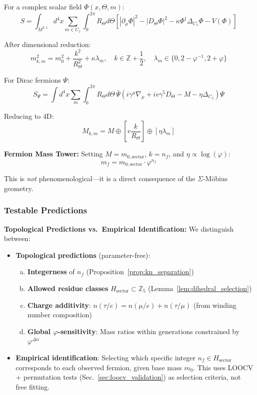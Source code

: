 \documentclass[12pt]{article}
\begin{document}
For a complex scalar field $\Phi(x, \Theta, m)$:
\begin{equation}
S = \int_{M^{3,1}} d^4x \sum_{m \in C_5} \int_0^{2\pi} R_\Theta d\Theta \left[ |\partial_\mu \Phi|^2 - |D_\Theta \Phi|^2 - \kappa \Phi^\dagger \Delta_{C_5} \Phi - V(\Phi) \right]
\end{equation}

After dimensional reduction:
\begin{equation}
\boxed{m_{k,m}^2 = m_0^2 + \frac{k^2}{R_\Theta^2} + \kappa \lambda_m}, \quad k \in \mathbb{Z} + \frac{1}{2}, \quad \lambda_m \in \{0, 2-\varphi^{-1}, 2+\varphi\}
\end{equation}

For Dirac fermions $\Psi$:
\begin{equation}
S_\Psi = \int d^4x \sum_m \int_0^{2\pi} R_\Theta d\Theta \, \bar{\Psi} \left( i\gamma^\mu \nabla_\mu + iv\gamma^5 D_\Theta - M - \eta \Delta_{C_5} \right) \Psi
\end{equation}

Reducing to 4D:
\begin{equation}
M_{k,m} = M \oplus \left[ v \frac{k}{R_\Theta} \right] \oplus \left[ \eta \lambda_m \right]
\end{equation}

\textbf{Fermion Mass Tower:} Setting $M = m_{0,\text{sector}}$, $k = n_f$, and $\eta \propto \log(\varphi)$:
\begin{equation}
\boxed{m_f = m_{0,\text{sector}} \cdot \varphi^{n_f}}
\end{equation}

This is \textit{not} phenomenological—it is a direct consequence of the $\Sigma$-M\"obius geometry.

\subsubsection{Testable Predictions}

\textbf{Topological Predictions vs.\ Empirical Identification:} We distinguish between:
\begin{itemize}
\item \textbf{Topological predictions} (parameter-free):
\begin{enumerate}[(a)]
\item \textbf{Integerness} of $n_f$ (Proposition~\ref{prop:kn_separation})
\item \textbf{Allowed residue classes} $H_{\text{sector}} \subset \mathbb{Z}_5$ (Lemma~\ref{lem:dihedral_selection})
\item \textbf{Charge additivity}: $n(\tau/e) = n(\mu/e) + n(\tau/\mu)$ (from winding number composition)
\item \textbf{Global $\varphi$-sensitivity}: Mass ratios within generations constrained by $\varphi^{\Delta n}$
\end{enumerate}

\item \textbf{Empirical identification}: Selecting which specific integer $n_f \in H_{\text{sector}}$ corresponds to each observed fermion, given base mass $m_0$. This uses LOOCV + permutation tests (Sec.~\ref{sec:loocv_validation}) as selection criteria, not free fitting.
\end{itemize}
\end{document}
